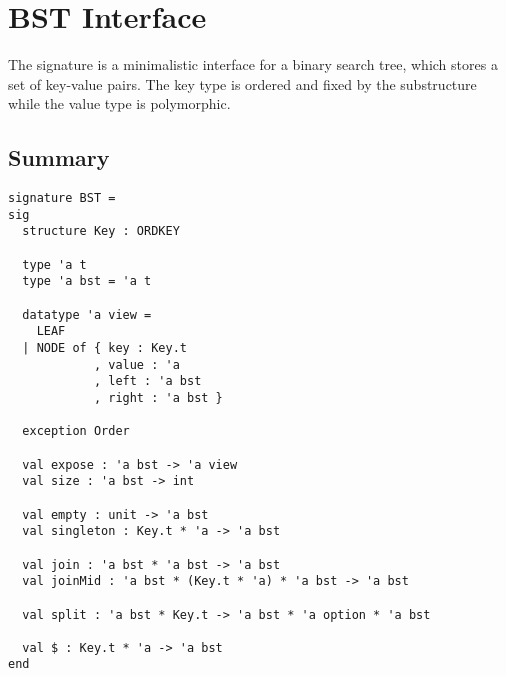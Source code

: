 \chapter{BST Interface}
\label{ch:bst-interface}

\begin{cluster}
\label{grp:grm:bst-interface::signature}

\begin{gram}
\label{grm:bst-interface::signature}
\label{ch:bst-interface}
\begin{preamble}
The  signature is a minimalistic interface for a binary search tree, which
stores a set of key-value pairs. The key type is ordered and fixed by the
 substructure while the value type is polymorphic.
\end{preamble}

\end{gram}
\end{cluster}


\section{Summary}
\label{sec:bst-interface::summary}

\begin{cluster}
\label{grp:grm:bst-interface::structure}

\begin{gram}
\label{grm:bst-interface::structure}
\begin{verbatim}
signature BST =
sig
  structure Key : ORDKEY

  type 'a t
  type 'a bst = 'a t

  datatype 'a view =
    LEAF
  | NODE of { key : Key.t
            , value : 'a
            , left : 'a bst
            , right : 'a bst }

  exception Order

  val expose : 'a bst -> 'a view
  val size : 'a bst -> int

  val empty : unit -> 'a bst
  val singleton : Key.t * 'a -> 'a bst

  val join : 'a bst * 'a bst -> 'a bst
  val joinMid : 'a bst * (Key.t * 'a) * 'a bst -> 'a bst

  val split : 'a bst * Key.t -> 'a bst * 'a option * 'a bst

  val $ : Key.t * 'a -> 'a bst
end
\end{verbatim}

\end{gram}
\end{cluster}


